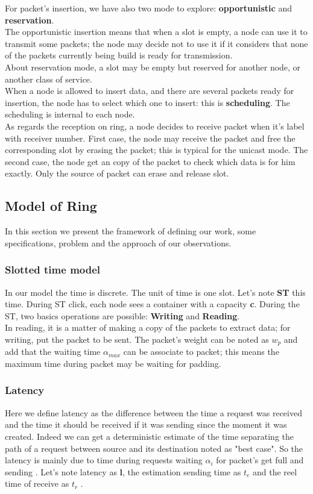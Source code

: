 \documentclass{article}
\begin{document}
For packet's insertion, we have also two mode to explore: \textbf{opportunistic} and \textbf{reservation}.\\ 
The opportunistic insertion means that when a slot is empty, a node can use it to transmit some packets; the node may decide not to use it if it considers that none of the packets currently being build is ready for transmission.\\
About reservation mode, a slot may be empty but reserved for another node, or another class of service.\\
When a node is allowed to insert data, and there are several packets ready for insertion, the node has to select which one to insert: this is \textbf{scheduling}. The scheduling is internal to each node.\\

As regards the reception  on ring, a node decides to receive packet when it's label with receiver number. First case, the node may receive the packet and free the corresponding slot by erasing the packet; this is typical for the unicast mode. The second case, the node get an copy of the packet to check which data is for him exactly. Only the source of packet can erase and release slot.\\


\subsection{Model of Ring}
In this section we present the framework of defining our work, some specifications, problem and the approach of our observations.
\subsubsection{Slotted time model}
In our model the time is discrete. The unit of time is one slot. Let's note \textbf{ST} this time. During ST click, each node sees a container with a capacity  \textbf{c}. During the ST, two basics operations are possible:  \textbf{Writing} and  \textbf{Reading}.\\
In reading, it is a matter of making a copy of the packets to extract  data; for writing, put the packet to be sent. The packet's weight can be noted  as \textbf{{$w_{p}$}} and add that the waiting time {$\alpha_{max}$} can be associate to packet; this means the maximum time during packet may be waiting for padding.

\subsubsection{Latency}
Here we define latency as the difference between the time a request was received and the time it should be received if it was sending since the moment it was created. Indeed we can get a deterministic estimate of the time separating the path of a request between source and its destination noted as "best case". So the latency is mainly due to time during requests waiting {$\alpha_{i}$} for packet's get full and sending . Let's note latency as  \textbf{l}, the estimation sending time as  \textbf{ {$t_{e}$} } and the reel time of receive as { {$t_{r}$} } .\\
\end{document}
